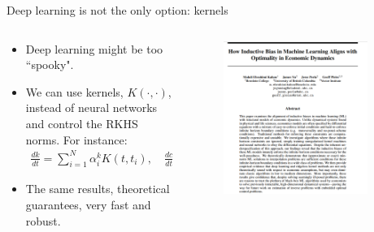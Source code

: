 \documentclass[aspectratio=169,10pt]{beamer}
\begin{document}
\begin{frame}{Deep learning is not the only option: kernels}
\begin{columns}
	\begin{column}{0.5\textwidth}
			\begin{itemize}
			\item Deep learning might be too ``spooky".
			\smallskip
			\item We can use kernels, $K(\cdot,\cdot)$, instead of neural networks and control the RKHS norms. For instance:
			\begin{align*}
				\frac{dk}{dt} = \sum_{i=1}^N \alpha^k_i K(t,t_i), \quad \frac{dc}{dt} = \sum_{i=1}^N \alpha^c_i K(t,t_i)
			\end{align*}
			\item The same results, theoretical guarantees, very fast and robust.
		\end{itemize}
	\end{column}
	\begin{column}{0.5\textwidth}
		\begin{figure}[t!]
			\centering
			\includegraphics[width=0.9\textwidth]{figs/Kernel}
			\vspace{-7mm}
		\end{figure}
	\end{column}
\end{columns}

\end{frame}
\end{document}
